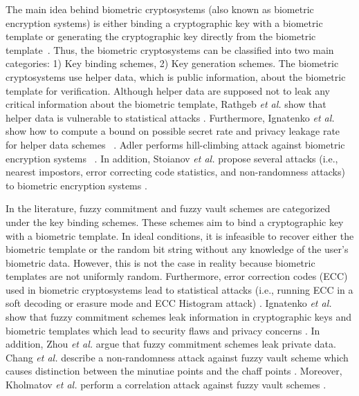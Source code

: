 \documentclass[journal]{IEEEtran}
\begin{document}
The main idea behind biometric cryptosystems (also known as biometric encryption systems) is either binding a cryptographic key with a biometric template or generating the cryptographic key directly from the biometric template~\cite{Uludag}. Thus, the biometric cryptosystems can be classified into two main categories: 1) Key binding schemes, 2) Key generation schemes. The biometric cryptosystems use helper data, which is public information, about the biometric template for verification. Although helper data are supposed not to leak any critical information about the biometric template, Rathgeb \textit{et al.} show that helper data is vulnerable to statistical attacks \cite{Rathgeb2}. Furthermore, Ignatenko \textit{et al.} show how to compute a bound on possible secret rate and privacy leakage rate for helper data schemes ~\cite{Ignatenko3}. Adler performs hill-climbing attack against biometric encryption systems ~\cite{Adler}. In addition, Stoianov \textit{et al.} propose several attacks (i.e., nearest impostors, error correcting code statistics, and non-randomness attacks) to biometric encryption systems \cite{Stoianov1}. 

In the literature, fuzzy commitment \cite{Juels2} and fuzzy vault schemes \cite{Juels} are categorized under the key binding schemes. These schemes aim to bind a cryptographic key with a biometric template. In ideal conditions, it is infeasible to recover either the biometric template or the random bit string without any knowledge of the user's biometric data. However, this is not the case in reality because biometric templates are not uniformly random. Furthermore, error correction codes (ECC) used in biometric cryptosystems lead to statistical attacks (i.e., running ECC in a soft decoding or erasure mode and ECC Histogram attack) \cite{Stoianov1, Stoianov2}. Ignatenko \textit{et al.} show that fuzzy commitment schemes leak information in cryptographic keys and biometric templates which lead to security flaws and privacy concerns \cite{Ignatenko1, Ignatenko2}. In addition, Zhou \textit{et al.} argue that fuzzy commitment schemes leak private data. Chang \textit{et al.} describe a non-randomness attack against fuzzy vault scheme which causes distinction between the minutiae points and the chaff points \cite{Chang}. Moreover, Kholmatov \textit{et al.} perform a correlation attack against fuzzy vault schemes \cite{berrin}.
\end{document}
